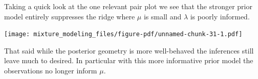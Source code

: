 \documentclass[
  letterpaper,
  DIV=11,
  numbers=noendperiod]{scrartcl}
\newenvironment{Shaded}{\begin{snugshade}}{\end{snugshade}}
\newcommand{\AttributeTok}[1]{\textcolor[rgb]{0.40,0.45,0.13}{#1}}
\newcommand{\DecValTok}[1]{\textcolor[rgb]{0.68,0.00,0.00}{#1}}
\newcommand{\FunctionTok}[1]{\textcolor[rgb]{0.28,0.35,0.67}{#1}}
\newcommand{\NormalTok}[1]{\textcolor[rgb]{0.00,0.23,0.31}{#1}}
\newcommand{\SpecialCharTok}[1]{\textcolor[rgb]{0.37,0.37,0.37}{#1}}
\newcommand{\StringTok}[1]{\textcolor[rgb]{0.13,0.47,0.30}{#1}}
\begin{document}
Taking a quick look at the one relevant pair plot we see that the
stronger prior model entirely suppresses the ridge where \(\mu\) is
small and \(\lambda\) is poorly informed.

\begin{Shaded}
\end{Shaded}

\texttt{[image: mixture\_modeling\_files/figure-pdf/unnamed-chunk-31-1.pdf]}

That said while the posterior geometry is more well-behaved the
inferences still leave much to desired. In particular with this more
informative prior model the observations no longer inform \(\mu\).

\begin{Shaded}
\end{Shaded}
\end{document}
